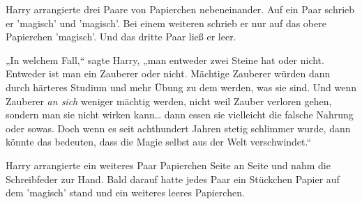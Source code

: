 Harry arrangierte drei Paare von Papierchen nebeneinander. Auf ein Paar schrieb er 'magisch' und 'magisch'. Bei einem weiteren schrieb er nur auf das obere Papierchen 'magisch'. Und das dritte Paar ließ er leer.

„In welchem Fall,“ sagte Harry, „man entweder zwei Steine hat oder nicht. Entweder ist man ein Zauberer oder nicht. Mächtige Zauberer würden dann durch härteres Studium und mehr Übung zu dem werden, was sie sind. Und wenn Zauberer \emph{an sich} weniger mächtig werden, nicht weil Zauber verloren gehen, sondern man sie nicht wirken kann… dann essen sie vielleicht die falsche Nahrung oder sowas. Doch wenn es seit achthundert Jahren stetig schlimmer wurde, dann könnte das bedeuten, dass die Magie selbst aus der Welt verschwindet.“

Harry arrangierte ein weiteres Paar Papierchen Seite an Seite und nahm die Schreibfeder zur Hand. Bald darauf hatte jedes Paar ein Stückchen Papier auf dem 'magisch' stand und ein weiteres leeres Papierchen.

